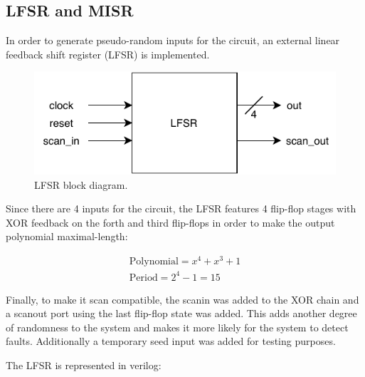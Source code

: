 \documentclass[12pt]{article}
\begin{document}
    
    
    \subsection*{LFSR and MISR}
    
    In order to generate pseudo-random inputs for the circuit, an external linear feedback shift register (LFSR) is implemented. 
    
    \begin{figure}[!htb]
        \centering
        \includegraphics[scale=1]{images/LFSR.pdf}
            \caption{LFSR block diagram.}
            \label{fig:lfsrbd}
    \end{figure}
    
    Since there are 4 inputs for the circuit, the LFSR features 4 flip-flop stages with XOR feedback on the forth and third flip-flops in order to make the output polynomial maximal-length:
    
    \begin{equation}
        \begin{matrix}
            \text{Polynomial} = x^{4} + x^{3} + 1 
            \\ 
            \text{Period}= 2^{4} -1 = 15
        \end{matrix}
    \end{equation}
    
    Finally, to make it scan compatible, the scan\textunderscore in was added to the XOR chain and a scan\textunderscore out port using the last flip-flop state was added. This adds another degree of randomness to the system and makes it more likely for the system to detect faults.
    Additionally a temporary seed input was added for testing purposes.
    
    The LFSR is represented in verilog:
  
\end{document}
